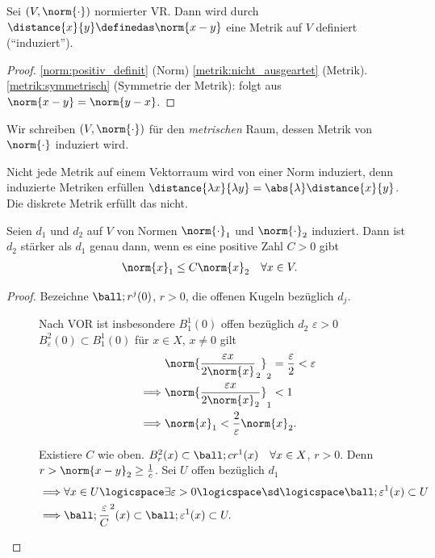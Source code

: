 \begin{lemma}
    Sei \( (V,\norm{\cdot}) \) normierter VR\@. Dann wird durch \( \distance{x}{y}\definedas \norm{x-y} \) eine Metrik auf \( V \) definiert (\enquote{induziert}).
\end{lemma}
\begin{proof}
    \ref{norm:positiv_definit} (Norm) \timplies \ref{metrik:nicht_ausgeartet} (Metrik). \ref{metrik:symmetrisch} (Symmetrie der Metrik): folgt aus \( \norm{x-y}=\norm{y-x} \).
\end{proof}
\begin{notation*}
    Wir schreiben \( (V,\norm{\cdot}) \) für den \emph{metrischen} Raum, dessen Metrik von \( \norm{\cdot} \) induziert wird.
\end{notation*}
\begin{bemerkung*}
    Nicht jede Metrik auf einem Vektorraum wird von einer Norm induziert, denn induzierte Metriken erfüllen \( \distance{\lambda x}{\lambda y}=\abs{\lambda}\distance{x}{y} \). Die diskrete Metrik erfüllt das nicht.
\end{bemerkung*}
\begin{lemma}\label{normen_staerke_abschaetzung}
    Seien \( d_1 \) und \( d_2 \) auf \( V \) von Normen \( \norm{\cdot}_1 \) und \( \norm{\cdot}_2 \) induziert. Dann ist \( d_2 \) stärker als \( d_1 \) genau dann, wenn es eine positive Zahl \( C>0 \) gibt \sd
    \begin{align*}
        \norm{x}_1\leq C\norm{x}_2\quad \forall x\in V.
    \end{align*}
\end{lemma}
\begin{proof}
    Bezeichne \( \ball;{r}^j(0) \), \( r>0 \), die offenen Kugeln bezüglich \( d_j \).
    \begin{description}
        \item[\hin] Nach VOR ist insbesondere \( B_1^1(0) \) offen bezüglich \( d_2 \) \timplies \texists \( \varepsilon>0 \) \sd \( B_\varepsilon^2(0)\subset B_1^1(0) \) \timplies für \( x\in X \), \( x\neq 0 \) gilt
        \begin{align*}
            &\norm{\frac{\varepsilon x}{2\norm{x}}_2}_2=\frac{\varepsilon}{2}<\varepsilon\\\
            \implies &\norm{\frac{\varepsilon x}{2\norm{x}_2}}_1 <1 \\
            \implies &\norm{x}_1<\frac{2}{\varepsilon}\norm{x}_2.
        \end{align*} 
        \item[\rueck] Existiere \( C \) wie oben. \( B_r^2(x)\subset \ball;{cr}^1(x)\quad \forall x\in X \), \( r>0 \). Denn \( r>\norm{x-y}_2\geq \frac{1}{c} \). Sei \( U \) offen bezüglich \( d_1 \)
        \begin{align*}
            \implies &\forall x\in U\logicspace \exists \varepsilon>0\logicspace\text{\sd} \logicspace \ball;{\varepsilon}^1(x)\subset U\\
            \implies &\ball;{\frac{\varepsilon}{C}}^2(x)\subset \ball;{\varepsilon}^1(x)\subset U.
        \end{align*} 
    \end{description}
    
\end{proof}
